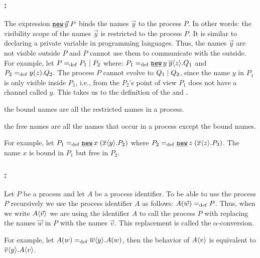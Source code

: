 \subsubsection{:}

The expression $\procres{\vec{y}}{P}$ binds the names $\vec{y}$ to the process $P$. In other words: the visibility scope of the  names $\vec{y}$ is restricted to the process $P$. It is similar to declaring a private variable in programming languages. Thus, the names $\vec{y}$ are not visible outside $P$ and $P$ cannot use them to communicate with the outside. For example, let $P=_{\mathrm{def}}P_1 \mid P_2$ where: $P_1\define\procres{y}{\out{y}{z}.Q_1}$ and $P_2=_{\mathrm{def}}y(z).Q_2$. The process $P$ cannot evolve to $Q_1 \mid Q_2$, since the name $y$ in $P_1$ is only visible inside $P_1$, i.e., from the $P_2$'s point of view $P_1$ does not have a channel called $y$. This takes us to the definition of the 
 and .

\begin{definition}
\label{def_bound_names}
 the bound names are all the restricted names in a process.
\end{definition}
\begin{definition}
\label{def_free_names}
 the free names are all the names that occur in a process except the bound names.
\end{definition}

For example, let $P_1\define\procres{x}{(\out{x}{y}.P_2)}$ where $P_2\define\procres{z}{(\out{x}{z}.P_3)}$. The name $x$ is bound in $P_1$ but free in $P_2$.


\subsubsection{:}
\label{subsubsection_process_call}

Let $P$ be a process and let $A$ be a process identifier. To be able to use the process $P$ recursively we use the process identifier $A$ as follows: $A(\vec{w})=_{\mathrm{def}}{}P$. Thus, when we write $A\langle\vec{v}\rangle$ we are using the identifier $A$ to call the process $P$ with replacing the names $\vec{w}$ in $P$ with the names $\vec{v}$. This replacement is called the $\alpha$-conversion.

For example, let $A(w)=_{\mathrm{def}}\overline{w}\langle y\rangle.A(w)$, then the behavior of $A\langle v\rangle$ is equivalent to $\overline{v}\langle y\rangle.A\langle v\rangle$. 

